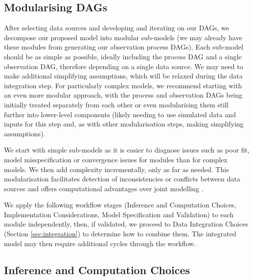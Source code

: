 \documentclass{article}
\begin{document}
\subsection{Modularising DAGs} \label{sec:modularise}

After selecting data sources and developing and iterating on our \ac{DAG}s, we decompose our proposed model into modular sub-models (we may already have these modules from generating our observation process \ac{DAG}s).
Each sub-model should be as simple as possible, ideally including the process DAG and a single observation DAG, therefore depending on a single data source.
We may need to make additional simplifying assumptions, which will be relaxed during the data integration step.
For particularly complex models, we recommend starting with an even more modular approach, with the process and observation DAGs being initially treated separately from each other or even modularising them still further into lower-level components (likely needing to use simulated data and inputs for this step and, as with other modularisation steps, making simplifying assumptions).

We start with simple sub-models as it is easier to diagnose issues such as poor fit, model misspecification or convergence issues for modules than for complex models.
We then add complexity incrementally, only as far as needed.
This modularisation facilitates detection of inconsistencies or conflicts between data sources \citep{presanis2013conflict,manderson2023combining} and offers computational advantages over joint modelling \citep{deangelis2018analysing,goudie2019joining,gelman2020bayesian,nicholson2022interoperability}.

We apply the following workflow stages (Inference and Computation Choices, Implementation Considerations, Model Specification and Validation) to each module independently, then, if validated, we proceed to Data Integration Choices (Section \ref{sec:integration}) to determine how to combine them.
The integrated model may then require additional cycles through the workflow.

\subsection{Inference and Computation Choices}\label{sec:fitting}
\end{document}
